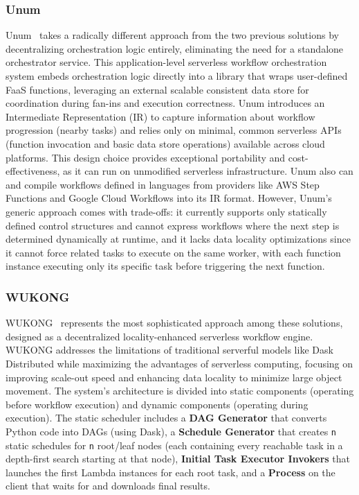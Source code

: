 \documentclass[conference]{IEEEtran}
\begin{document}
\subsubsection{Unum}
Unum~\cite{unum_decentralized_orchestrator} takes a radically different approach from the two previous solutions by decentralizing orchestration logic entirely, eliminating the need for a standalone orchestrator service. This application-level serverless workflow orchestration system embeds orchestration logic directly into a library that wraps user-defined FaaS functions, leveraging an external scalable consistent data store for coordination during fan-ins and execution correctness. Unum introduces an Intermediate Representation (IR) to capture information about workflow progression (nearby tasks) and relies only on minimal, common serverless APIs (function invocation and basic data store operations) available across cloud platforms. This design choice provides exceptional portability and cost-effectiveness, as it can run on unmodified serverless infrastructure. Unum also can and compile workflows defined in languages from providers like AWS Step Functions and Google Cloud Workflows into its IR format. However, Unum's generic approach comes with trade-offs: it currently supports only statically defined control structures and cannot express workflows where the next step is determined dynamically at runtime, and it lacks data locality optimizations since it cannot force related tasks to execute on the same worker, with each function instance executing only its specific task before triggering the next function.

\subsubsection{WUKONG}
WUKONG~\cite{wukong_2} represents the most sophisticated approach among these solutions, designed as a decentralized locality-enhanced serverless workflow engine. WUKONG addresses the limitations of traditional serverful models like Dask Distributed while maximizing the advantages of serverless computing, focusing on improving scale-out speed and enhancing data locality to minimize large object movement. The system's architecture is divided into static components (operating before workflow execution) and dynamic components (operating during execution). The static scheduler includes a \textbf{DAG Generator} that converts Python code into DAGs (using Dask), a \textbf{Schedule Generator} that creates \texttt{n} static schedules for \texttt{n} root/leaf nodes (each containing every reachable task in a depth-first search starting at that node), \textbf{Initial Task Executor Invokers} that launches the first Lambda instances for each root task, and a \textbf{Process} on the client that waits for and downloads final results. 
\end{document}
